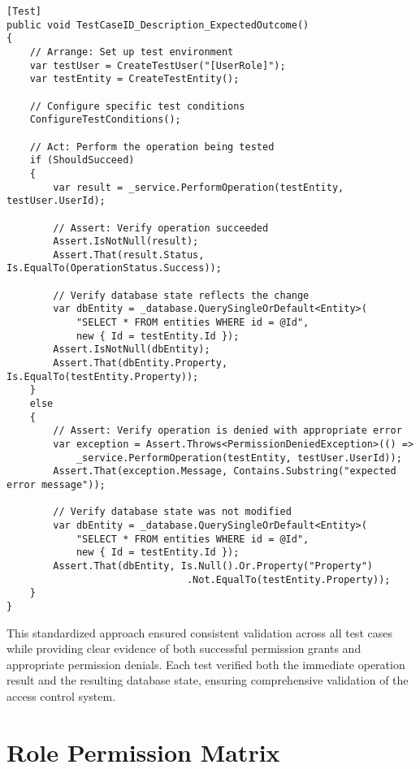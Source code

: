 \begin{lstlisting}[language=CSharp, caption={Test Case Implementation Template}, label={lst:test-case-template}]
[Test]
public void TestCaseID_Description_ExpectedOutcome()
{
    // Arrange: Set up test environment
    var testUser = CreateTestUser("[UserRole]");
    var testEntity = CreateTestEntity();
    
    // Configure specific test conditions
    ConfigureTestConditions();
    
    // Act: Perform the operation being tested
    if (ShouldSucceed)
    {
        var result = _service.PerformOperation(testEntity, testUser.UserId);
        
        // Assert: Verify operation succeeded
        Assert.IsNotNull(result);
        Assert.That(result.Status, Is.EqualTo(OperationStatus.Success));
        
        // Verify database state reflects the change
        var dbEntity = _database.QuerySingleOrDefault<Entity>(
            "SELECT * FROM entities WHERE id = @Id", 
            new { Id = testEntity.Id });
        Assert.IsNotNull(dbEntity);
        Assert.That(dbEntity.Property, Is.EqualTo(testEntity.Property));
    }
    else
    {
        // Assert: Verify operation is denied with appropriate error
        var exception = Assert.Throws<PermissionDeniedException>(() => 
            _service.PerformOperation(testEntity, testUser.UserId));
        Assert.That(exception.Message, Contains.Substring("expected error message"));
        
        // Verify database state was not modified
        var dbEntity = _database.QuerySingleOrDefault<Entity>(
            "SELECT * FROM entities WHERE id = @Id", 
            new { Id = testEntity.Id });
        Assert.That(dbEntity, Is.Null().Or.Property("Property")
                               .Not.EqualTo(testEntity.Property));
    }
}
\end{lstlisting}

This standardized approach ensured consistent validation across all test cases while providing clear evidence of both successful permission grants and appropriate permission denials. Each test verified both the immediate operation result and the resulting database state, ensuring comprehensive validation of the access control system.

\section{Role Permission Matrix}
\label{sec:role-permission-matrix}

